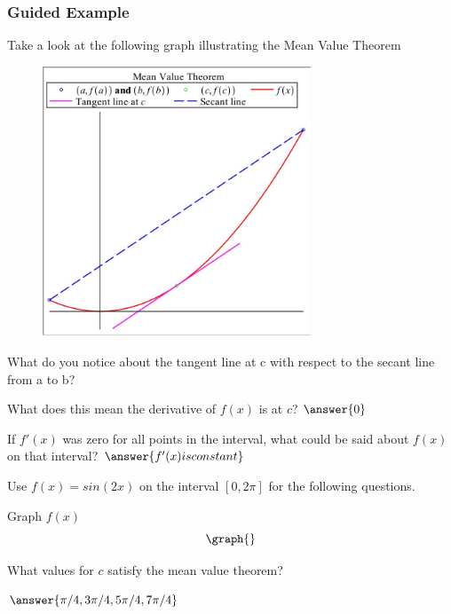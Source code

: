 \documentclass{ximera}
\begin{document}
\subsubsection{Guided Example}
Take a look at the following graph illustrating the Mean Value Theorem
\begin{figure}[H]
    \centering
    \includegraphics[width=80mm]{meanvalue.jpg}
    \label{fig:meanvalue}
\end{figure}
\begin{question}
What do you notice about the tangent line at c with respect to the secant line from a to b?
\begin{freeResponse}
\end{freeResponse}
What does this mean the derivative of $f(x)$ is at $c$?
$\answer{0}$
\end{question}
\begin{question}
If $f'(x)$ was zero for all points in the interval, what could be said about $f(x)$ on that interval?
$\answer{f'(x) is constant}$
\end{question}
\begin{question}
Use $f(x)=sin(2x)$ on the interval $[0,2\pi]$ for the following questions.

Graph $f(x)$
\[
\graph{}
\]

What values for $c$ satisfy the mean value theorem?

$\answer{\pi/4,3\pi/4,5\pi/4, 7\pi/4}$
\end{question}
\end{document}
